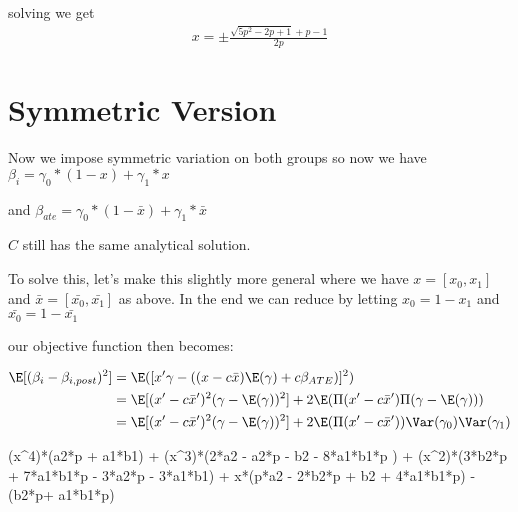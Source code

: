 solving we get 
\begin{align*}
	x = \pm \frac{\sqrt{5 p^2 - 2p + 1} +p -1}{2p}
\end{align*} 




\section{Symmetric Version}
Now we impose symmetric variation on both groups so now we have
$\beta_i = \gamma_0*(1-x)+\gamma_1*x$

and 
$\beta_{ate} = \gamma_0*(1-\bar{x})+\gamma_1*\bar{x}$

$C$ still has the same analytical solution.

To solve this, let's make this slightly more general where we have $x = [x_0, x_1]$ and $\bar{x} = [\bar{x_0}, \bar{x_1}]$ as above. In the end we can reduce by letting $x_0 = 1 - x_1$ and  $\bar{x_0} = 1 - \bar{x_1}$

our objective function then becomes:

\begin{align*}
	\E[(\beta_i - \beta_{i,post})^2] &= \E([ x' \gamma  - ((x - c\bar{x}) \E(\gamma) + c \beta_{ATE})]^2) \\
									 &= \E[ (x' - c\bar{x}')^2 (\gamma - \E(\gamma))^2] + 2\E(\Pi(x' - c\bar{x}') \Pi(\gamma - \E(\gamma))) \\
									 &= \E[ (x' - c\bar{x}')^2 (\gamma - \E(\gamma))^2] + 2\E(\Pi(x' - c\bar{x}'))\Var(\gamma_0)\Var(\gamma_1) \\
\end{align*} 



(x^4)*(a2*p + a1*b1) + (x^3)*(2*a2 - a2*p - b2 - 8*a1*b1*p ) + (x^2)*(3*b2*p + 7*a1*b1*p - 3*a2*p - 3*a1*b1) + x*(p*a2 - 2*b2*p + b2 + 4*a1*b1*p) - (b2*p+ a1*b1*p)
